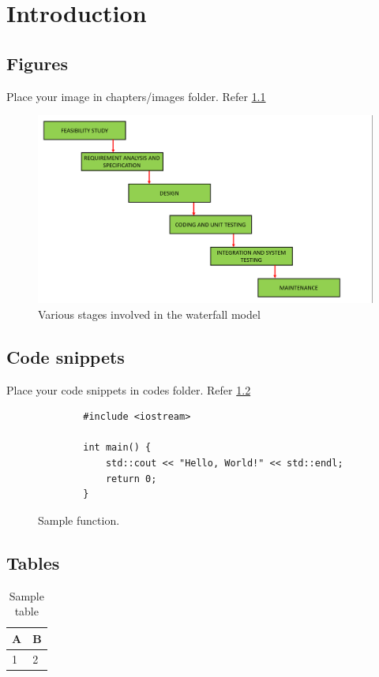 \chapter{Introduction}

\section{Figures}

Place your image in chapters/images folder. Refer \ref{fig:waterfall}
\begin{figure}
	\centering
	\includegraphics[scale=0.15]{chp/img/waterfall.png}
	\caption{Various stages involved in the waterfall model}
	\label{fig:waterfall}
\end{figure}

\section{Code snippets}
Place your code snippets in codes folder. Refer \ref{fig:sample_code} 
\begin{figure}

	\begin{lstlisting}
		#include <iostream>
		
		int main() {
			std::cout << "Hello, World!" << std::endl;
			return 0;
		}
	\end{lstlisting}

	\caption{Sample function.}
	\label{fig:sample_code}
\end{figure}


\section{Tables}
\begin{table}
	\centering
	\begin{tabular}{l|l}
		A & B \\
		\hline 
		1 & 2 
	\end{tabular}
	\caption{Sample table}
	\label{tab:highlights}
\end{table}

